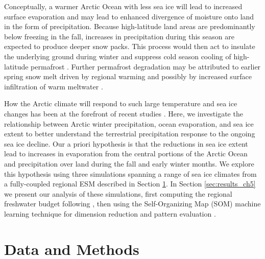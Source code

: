 Conceptually, a warmer Arctic Ocean with less sea ice will lead to increased surface evaporation and may lead to enhanced divergence of moisture onto land in the form of precipitation.
Because high-latitude land areas are predominantly below freezing in the fall, increases in precipitation during this season are expected to produce deeper snow packs.
This process would then act to insulate the underlying ground during winter and suppress cold season cooling of high-latitude permafrost \citep{Osterkamp_1999,Zhang_2005,Lawrence_2010}.
Further permafrost degradation may be attributed to earlier spring snow melt driven by regional warming and possibly by increased surface infiltration of warm meltwater \citep{Lawrence_2010}.

How the Arctic climate will respond to such large temperature and sea ice changes has been at the forefront of recent studies \citep[e.g. ][]{Kazutoshi_2014,Simmonds_2014,Wegmann_2015,Vihma_2014}.
Here, we investigate the relationship between Arctic winter precipitation, ocean evaporation, and sea ice extent to better understand the terrestrial precipitation response to the ongoing sea ice decline.
Our a priori hypothesis is that the reductions in sea ice extent lead to increases in evaporation from the central portions of the Arctic Ocean and precipitation over land during the fall and early winter months.
We explore this hypothesis using three simulations spanning a range of sea ice climates from a fully-coupled regional ESM described in Section \ref{sec:data_models_ch5}.
In Section \ref{sec:results_ch5} we present our analysis of these simulations, first computing the regional freshwater budget following \citet{Serreze_2006a}, then using the Self-Organizing Map (SOM) machine learning technique for dimension reduction and pattern evaluation \citep{Kohonen_1998,Hewitson_2002}.

\section{Data and Methods}
\label{sec:data_models_ch5}

